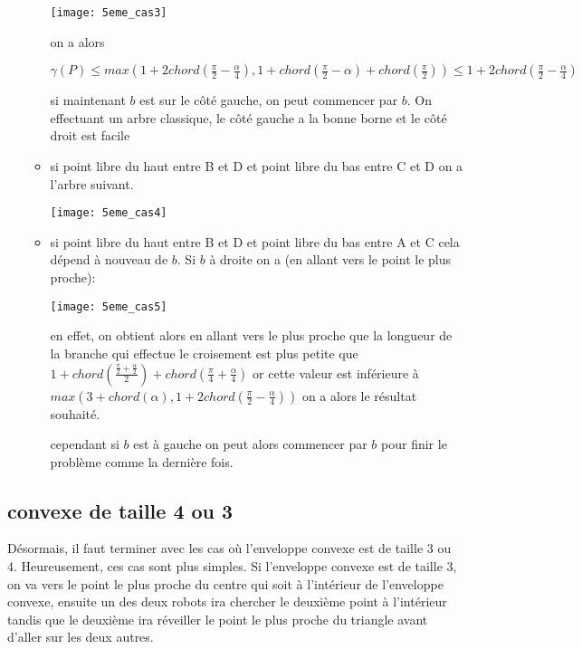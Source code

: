 \begin{itemize}
\begin{itemize}
\texttt{[image: 5eme\_cas3]}

on a alors

$\gamma(P) \leq max\left(1+2chord\left(\frac{\pi}{2} - \frac{\alpha}{4}\right), 1 + chord\left(\frac{\pi}{2} - \alpha\right) + chord\left(\frac{\pi}{2}\right)\right) \leq 1+2chord\left(\frac{\pi}{2} - \frac{\alpha}{4}\right)$

si maintenant $b$ est sur le côté gauche, on peut commencer par $b$. On effectuant un arbre classique, le côté gauche a la bonne borne et le côté droit est facile

\item si point libre du haut entre B et D et point libre du bas entre C et D on a l'arbre suivant.

\texttt{[image: 5eme\_cas4]}

\item si point libre du haut entre B et D et point libre du bas entre A et C cela dépend à nouveau de $b$. Si $b$ à droite on a (en allant vers le point le plus proche):

\texttt{[image: 5eme\_cas5]}

en effet, on obtient alors en allant vers le plus proche que la longueur de la branche qui effectue le croisement est plus petite que $1+chord\left(\frac{\frac{\pi}{2} + \frac{\alpha}{2}}{2}\right) + chord\left(\frac{\pi}{4} + \frac{\alpha}{4}\right)$ or cette valeur est inférieure à $max\left(3 + chord\left(\alpha\right), 1 + 2chord\left(\frac{\pi}{2} - \frac{\alpha}{4}\right)\right)$ on a alors le résultat souhaité.

cependant si $b$ est à gauche on peut alors commencer par $b$ pour finir le problème comme la dernière fois.

\end{itemize}
\end{itemize}

\subsection{convexe de taille 4 ou 3}

Désormais, il faut terminer avec les cas où l'enveloppe convexe est de taille 3 ou 4. Heureusement, ces cas sont plus simples.
Si l'enveloppe convexe est de taille 3, on va vers le point le plus proche du centre qui soit à l'intérieur de l'enveloppe convexe, ensuite un des deux robots ira chercher le deuxième point à l'intérieur tandis que le deuxième ira réveiller le point le plus proche du triangle avant d'aller sur les deux autres.


